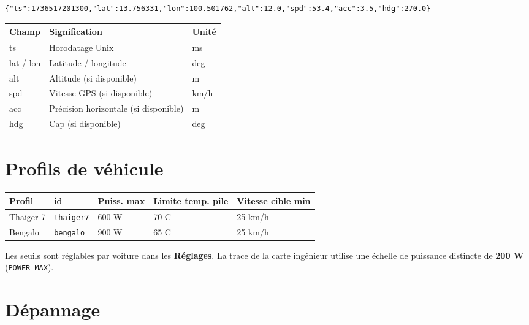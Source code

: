 \documentclass[11pt,a4paper,oneside]{report}
\newcommand{\degC}{\textdegree C}
\newcommand{\code}[1]{\texttt{#1}}
\begin{document}
\begin{lstlisting}
{"ts":1736517201300,"lat":13.756331,"lon":100.501762,"alt":12.0,"spd":53.4,"acc":3.5,"hdg":270.0}
\end{lstlisting}

\begin{tabularx}{\linewidth}{@{}lLl@{}}
\toprule
\textbf{Champ} & \textbf{Signification} & \textbf{Unité}\\
\midrule
ts & Horodatage Unix & ms\\
lat / lon & Latitude / longitude & deg\\
alt & Altitude (si disponible) & m\\
spd & Vitesse GPS (si disponible) & km/h\\
acc & Précision horizontale (si disponible) & m\\
hdg & Cap (si disponible) & deg\\
\bottomrule
\end{tabularx}

\section{Profils de véhicule}

\begin{tabularx}{\linewidth}{@{}llllL@{}}
\toprule
\textbf{Profil} & \textbf{id} & \textbf{Puiss. max} & \textbf{Limite temp. pile} & \textbf{Vitesse cible min}\\
\midrule
Thaiger 7 & \code{thaiger7} & 600 W & 70 \degC{} & 25 km/h\\
Bengalo & \code{bengalo} & 900 W & 65 \degC{} & 25 km/h\\
\bottomrule
\end{tabularx}

\medskip
Les seuils sont réglables par voiture dans les \textbf{Réglages}. La trace de la
carte ingénieur utilise une échelle de puissance distincte de \textbf{200 W}
(\code{POWER\_MAX}).

\section{Dépannage}
\end{document}
